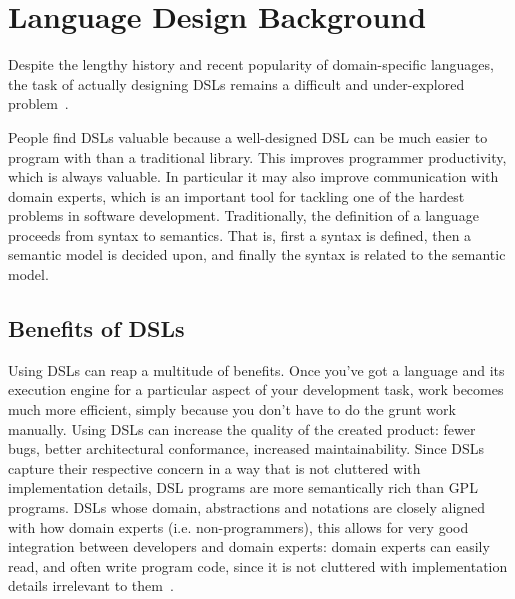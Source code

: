\section{Language Design Background}
Despite the lengthy history and recent popularity of domain-specific languages, the task of actually
designing DSLs remains a difficult and under-explored problem~\cite{erwig2014semantics}.

People find DSLs valuable because a well-designed DSL can be much easier to program with than a traditional library. This improves programmer productivity, which is always valuable. In particular it may also improve communication with domain experts, which is an important tool for tackling one of the hardest problems in software development.
Traditionally, the definition of a language proceeds from syntax to semantics. That is, first a syntax is
defined, then a semantic model is decided upon, and finally the syntax is related to the semantic model. 

\subsection{Benefits of DSLs}
Using DSLs can reap a multitude of benefits. 
Once you’ve got a language and its execution engine for a particular aspect of your development task, work becomes much more efficient, simply because you don’t have to do the grunt work manually. 
Using DSLs can increase the quality of the created product: fewer bugs, better architectural conformance, increased maintainability.
Since DSLs capture their respective concern in a way that is not cluttered with implementation details, DSL programs are more semantically rich than GPL programs.
DSLs whose domain, abstractions and notations are closely aligned with how domain experts (i.e. non-programmers), this allows for very good integration between developers and domain experts: domain experts can easily read, and often write program code, since it is not cluttered with implementation details irrelevant to them~\cite{voelter2013dsl}.